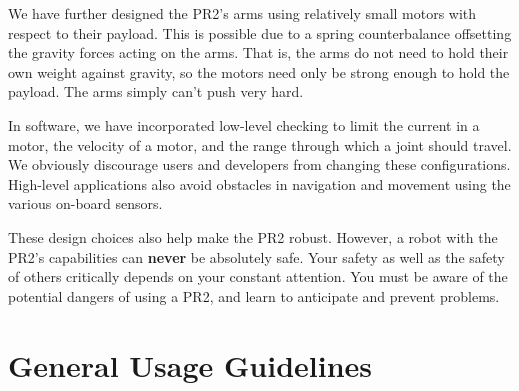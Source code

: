 We have further designed the PR2's arms using relatively small motors with respect to their payload.  This is possible due to a spring counterbalance offsetting the gravity forces acting on the arms.  That is, the arms do not need to hold their own weight against gravity, so the motors need only be strong enough to hold the payload.  The arms simply can't push very hard.

In software, we have incorporated low-level checking to limit the current in a motor, the velocity of a motor, and the range through which a joint should travel.  We obviously discourage users and developers from changing these configurations.  High-level applications also avoid obstacles in navigation and movement using the various on-board sensors.  

These design choices also help make the PR2 robust.  However, a robot with the PR2’s capabilities can {\bf never} be absolutely safe. Your safety as well as the safety of others critically depends on your constant attention. You must be aware of the potential dangers of using a PR2, and learn to anticipate and prevent problems.

\section{General Usage Guidelines}

